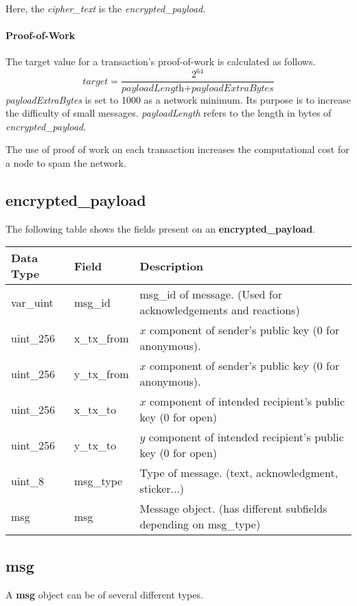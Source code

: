 \documentclass{article}
\begin{document}
Here, the \textit{cipher\_text} is the \textit{encrypted\_payload}.

\paragraph{Proof-of-Work}
The target value for a transaction's proof-of-work is calculated as follows.
\[\textit{target} = \dfrac{2^{64}}{\textit{payloadLength} + \textit{payloadExtraBytes}}\]
\textit{payloadExtraBytes} is set to 1000 as a network minimum. Its purpose is to increase the difficulty of small messages. \textit{payloadLength} refers to the length in bytes of \textit{encrypted\_payload}.

The use of proof of work on each transaction increases the computational cost for a node to spam the network.

\subsection{encrypted\_payload}
The following table shows the fields present on an \textbf{encrypted\_payload}.
\begin{table}[H]
\centering
\begin{tabular}{|p{1.3cm}|p{2.5cm}|p{5.5cm}|}
\hline
\rowcolor{tblgrey}
Data Type   & Field & Description\\ \hline
var\_uint   & msg\_id     & msg\_id of message. (Used for acknowledgements and reactions)\\ \hline
uint\_256   & x\_tx\_from & $x$ component of sender's public key (0 for anonymous).      \\ \hline
uint\_256   & y\_tx\_from & $x$ component of sender's public key (0 for anonymous).      \\ \hline
uint\_256   & x\_tx\_to   & $x$ component of intended recipient's public key (0 for open)\\ \hline
uint\_256   & y\_tx\_to   & $y$ component of intended recipient's public key (0 for open)\\ \hline
uint\_8     & msg\_type   & Type of message. (text, acknowledgment, sticker...)          \\ \hline
msg         & msg         & Message object. (has different subfields depending on msg\_type) \\ \hline
\end{tabular}
\end{table}

\newpage

\subsection{msg}
A \textbf{msg} object can be of several different types.
\end{document}

